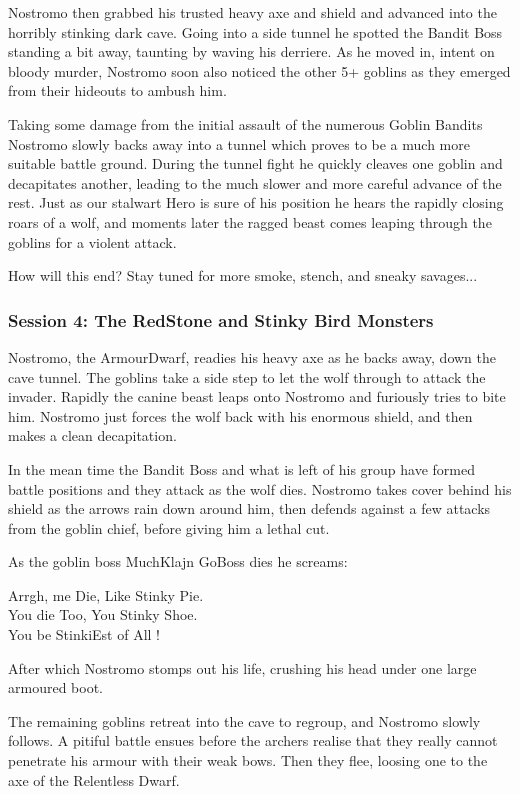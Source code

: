 Nostromo then grabbed his trusted heavy axe and shield and advanced into the horribly stinking dark cave. Going into a side tunnel he spotted the Bandit Boss standing a bit away, taunting by waving his derriere. As he moved in, intent on bloody murder, Nostromo soon also noticed the other 5+ goblins as they emerged from their hideouts to ambush him.

Taking some damage from the initial assault of the numerous Goblin Bandits Nostromo slowly backs away into a tunnel which proves to be a much more suitable battle ground. During the tunnel fight he quickly cleaves one goblin and decapitates another, leading to the much slower and more careful advance of the rest. Just as our stalwart Hero is sure of his position he hears the rapidly closing roars of a wolf, and moments later the ragged beast comes leaping through the goblins for a violent attack.

How will this end? Stay tuned for more smoke, stench, and sneaky savages...


\subsubsection*{Session 4: The RedStone and Stinky Bird Monsters}
Nostromo, the ArmourDwarf, readies his heavy axe as he backs away, down the cave tunnel. The goblins take a side step to let the wolf through to attack the invader. Rapidly the canine beast leaps onto Nostromo and furiously tries to bite him. Nostromo just forces the wolf back with his enormous shield, and then makes a clean decapitation.

In the mean time the Bandit Boss and what is left of his group have formed battle positions and they attack as the wolf dies. Nostromo takes cover behind his shield as the arrows rain down around him, then defends against a few attacks from the goblin chief, before giving him a lethal cut.

As the goblin boss MuchKlajn GoBoss dies he screams:
\begin{readoutloud}
Arrgh, me Die, Like Stinky Pie.\\
You die Too, You Stinky Shoe.\\
You be StinkiEst of All !
\end{readoutloud}
After which Nostromo stomps out his life, crushing his head under one large armoured boot.

The remaining goblins retreat into the cave to regroup, and Nostromo slowly follows. A pitiful battle ensues before the archers realise that they really cannot penetrate his armour with their weak bows. Then they flee, loosing one to the axe of the Relentless Dwarf.

